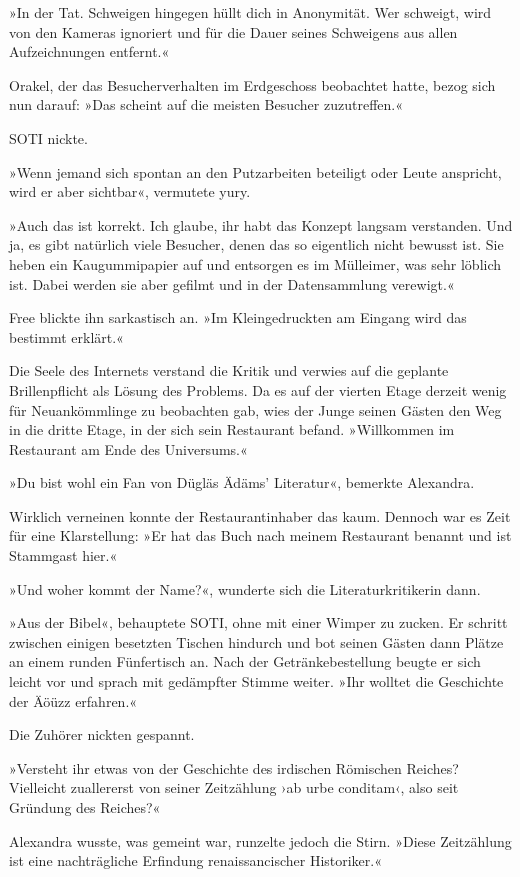»In der Tat. Schweigen hingegen hüllt dich in Anonymität. Wer schweigt, wird von den Kameras ignoriert und für die Dauer seines Schweigens aus allen Aufzeichnungen entfernt.«

Orakel, der das Besucherverhalten im Erdgeschoss beobachtet hatte, bezog sich nun darauf: »Das scheint auf die meisten Besucher zuzutreffen.«

SOTI nickte.

»Wenn jemand sich spontan an den Putzarbeiten beteiligt oder Leute anspricht, wird er aber sichtbar«, vermutete yury.

»Auch das ist korrekt. Ich glaube, ihr habt das Konzept langsam verstanden. Und ja, es gibt natürlich viele Besucher, denen das so eigentlich nicht bewusst ist. Sie heben ein Kaugummipapier auf und entsorgen es im Mülleimer, was sehr löblich ist. Dabei werden sie aber gefilmt und in der Datensammlung verewigt.«

Free blickte ihn sarkastisch an. »Im Kleingedruckten am Eingang wird das bestimmt erklärt.«

Die Seele des Internets verstand die Kritik und verwies auf die geplante Brillenpflicht als Lösung des Problems. Da es auf der vierten Etage derzeit wenig für Neuankömmlinge zu beobachten gab, wies der Junge seinen Gästen den Weg in die dritte Etage, in der sich sein Restaurant befand. »Willkommen im Restaurant am Ende des Universums.«

»Du bist wohl ein Fan von Dügläs Ädäms’ Literatur«, bemerkte Alexandra.

Wirklich verneinen konnte der Restaurantinhaber das kaum. Dennoch war es Zeit für eine Klarstellung: »Er hat das Buch nach meinem Restaurant benannt und ist Stammgast hier.«

»Und woher kommt der Name?«, wunderte sich die Literaturkritikerin dann.

»Aus der Bibel«, behauptete SOTI, ohne mit einer Wimper zu zucken. Er schritt zwischen einigen besetzten Tischen hindurch und bot seinen Gästen dann Plätze an einem runden Fünfertisch an. Nach der Getränkebestellung beugte er sich leicht vor und sprach mit gedämpfter Stimme weiter. »Ihr wolltet die Geschichte der Äöüzz erfahren.«

Die Zuhörer nickten gespannt.

»Versteht ihr etwas von der Geschichte des irdischen Römischen Reiches? Vielleicht zuallererst von seiner Zeitzählung ›ab urbe conditam‹, also seit Gründung des Reiches?«

Alexandra wusste, was gemeint war, runzelte jedoch die Stirn. »Diese Zeitzählung ist eine nachträgliche Erfindung renaissancischer Historiker.«

